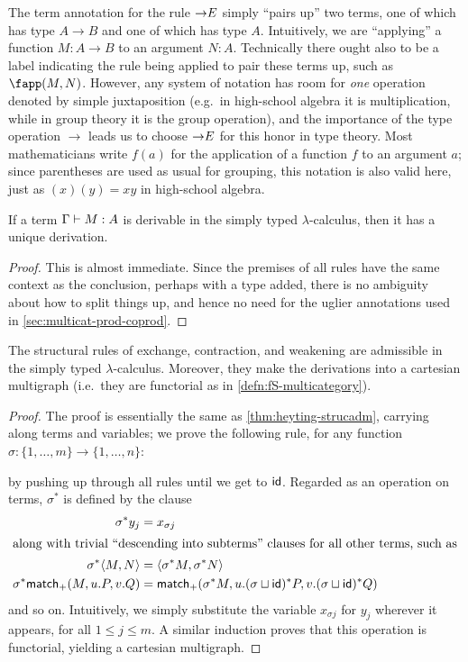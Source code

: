 The term annotation for the rule $\toE$ simply ``pairs up'' two terms, one of which has type $A\to B$ and one of which has type $A$.
Intuitively, we are ``applying'' a function $M:A\to B$ to an argument $N:A$.
Technically there ought also to be a label indicating the rule being applied to pair these terms up, such as $\fapp(M,N)$.
However, any system of notation has room for \emph{one} operation denoted by simple juxtaposition (e.g.\ in high-school algebra it is multiplication, while in group theory it is the group operation), and the importance of the type operation $\to$ leads us to choose $\toE$ for this honor in type theory.
Most mathematicians write $f(a)$ for the application of a function $f$ to an argument $a$; since parentheses are used as usual for grouping, this notation is also valid here, just as $(x)(y)=xy$ in high-school algebra.

\begin{lem}\label{thm:stlc-uniqderiv}
  If a term $\Gamma\types M:A$ is derivable in the simply typed $\lambda$-calculus, then it has a unique derivation.
\end{lem}
\begin{proof}
  This is almost immediate.
  Since the premises of all rules have the same context as the conclusion, perhaps with a type added, there is no ambiguity about how to split things up, and hence no need for the uglier annotations used in \cref{sec:multicat-prod-coprod}.
\end{proof}

\begin{lem}\label{thm:stlc-strucadm}
  The structural rules of exchange, contraction, and weakening are admissible in the simply typed $\lambda$-calculus.
  Moreover, they make the derivations into a cartesian multigraph (i.e.\ they are functorial as in \cref{defn:fS-multicategory}).
\end{lem}
\begin{proof}
  The proof is essentially the same as \cref{thm:heyting-strucadm}, carrying along terms and variables; we prove the following rule, for any function $\sigma : \{1,\dots,m\} \to \{1,\dots,n\}$:
  \begin{mathpar}
  \end{mathpar}
  by pushing up through all rules until we get to $\idfunc$.
  Regarded as an operation on terms, $\sigma^*$ is defined by the clause
  \begin{align*}
    \sigma^*y_j &= x_{\sigma j}\\
    \intertext{along with trivial ``descending into subterms'' clauses for all other terms, such as}
    \sigma^*\pair M N &= \pair{\sigma^*M}{\sigma^*N}\\
    \sigma^*\case(M,u.P,v.Q) &= \case(\sigma^*M, u.(\sigma\sqcup\idfunc)^*P,v.(\sigma\sqcup\idfunc)^*Q)
  \end{align*}
  and so on.
  Intuitively, we simply substitute the variable $x_{\sigma j}$ for $y_j$ wherever it appears, for all $1\le j\le m$.
  A similar induction proves that this operation is functorial, yielding a cartesian multigraph.
\end{proof}

